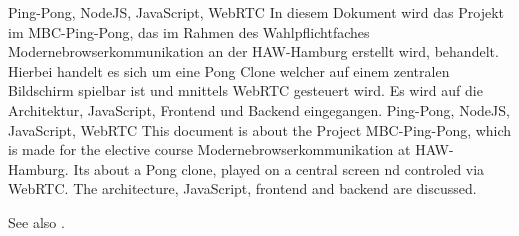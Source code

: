 \documentclass[draft=false
              ,paper=a4
              ,twoside=false
              ,fontsize=11pt
              ,headsepline
              ,BCOR10mm
              ,DIV11
              ]{scrbook}
\begin{document}


\frontmatter

\maketitle

\onehalfspacing

\HAWAbstractPage
{Ping-Pong, NodeJS, JavaScript, WebRTC}%
{In diesem Dokument wird das Projekt im MBC-Ping-Pong, das im Rahmen des Wahlpflichtfaches Modernebrowserkommunikation an der HAW-Hamburg erstellt wird, behandelt. Hierbei handelt es sich um eine Pong Clone welcher auf einem zentralen Bildschirm spielbar ist und mnittels WebRTC gesteuert wird. Es wird auf die Architektur, JavaScript, Frontend und Backend eingegangen. }
{Ping-Pong, NodeJS, JavaScript, WebRTC}%
{This document is about the Project MBC-Ping-Pong, which is made for the elective course Modernebrowserkommunikation at HAW-Hamburg. Its about a Pong clone, played on a central screen nd controled via WebRTC. The architecture, JavaScript, frontend and backend are discussed. }

\newpage
\singlespacing

\tableofcontents
\newpage
\listoftables
\listoffigures

\mainmatter
\onehalfspacing








See also \cite{sample_bib}.
\end{document}
